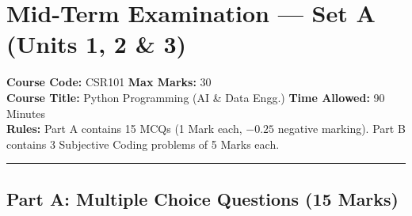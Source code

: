 \section{Mid-Term Examination --- Set A (Units 1, 2 \& 3)}
\noindent\textbf{Course Code:} CSR101 \hfill \textbf{Max Marks:} 30\\
\textbf{Course Title:} Python Programming (AI \& Data Engg.) \hfill \textbf{Time Allowed:} 90 Minutes\\
\textbf{Rules:} Part A contains 15 MCQs (1 Mark each, $-0.25$ negative marking). Part B contains 3 Subjective Coding problems of 5 Marks each.
\vspace{4mm}
\hrule
\vspace{4mm}

\subsection*{Part A: Multiple Choice Questions (15 Marks)}
